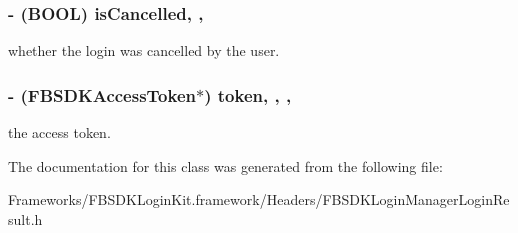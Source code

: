\subsubsection[{is\+Cancelled}]{\setlength{\rightskip}{0pt plus 5cm}-\/ (B\+O\+O\+L) is\+Cancelled\hspace{0.3cm}{\ttfamily [read]}, {\ttfamily [nonatomic]}, {\ttfamily [assign]}}\label{interface_f_b_s_d_k_login_manager_login_result_a95ae85cb68f693c343232670c3d1ae64}
whether the login was cancelled by the user. \hypertarget{interface_f_b_s_d_k_login_manager_login_result_a5140b7c91559db23ec845ffb20369dc9}{}
\subsubsection[{token}]{\setlength{\rightskip}{0pt plus 5cm}-\/ ({\bf F\+B\+S\+D\+K\+Access\+Token}$\ast$) token\hspace{0.3cm}{\ttfamily [read]}, {\ttfamily [write]}, {\ttfamily [nonatomic]}, {\ttfamily [copy]}}\label{interface_f_b_s_d_k_login_manager_login_result_a5140b7c91559db23ec845ffb20369dc9}
the access token. 

The documentation for this class was generated from the following file\+:\begin{DoxyCompactItemize}
\item 
Frameworks/\+F\+B\+S\+D\+K\+Login\+Kit.\+framework/\+Headers/F\+B\+S\+D\+K\+Login\+Manager\+Login\+Result.\+h\end{DoxyCompactItemize}
